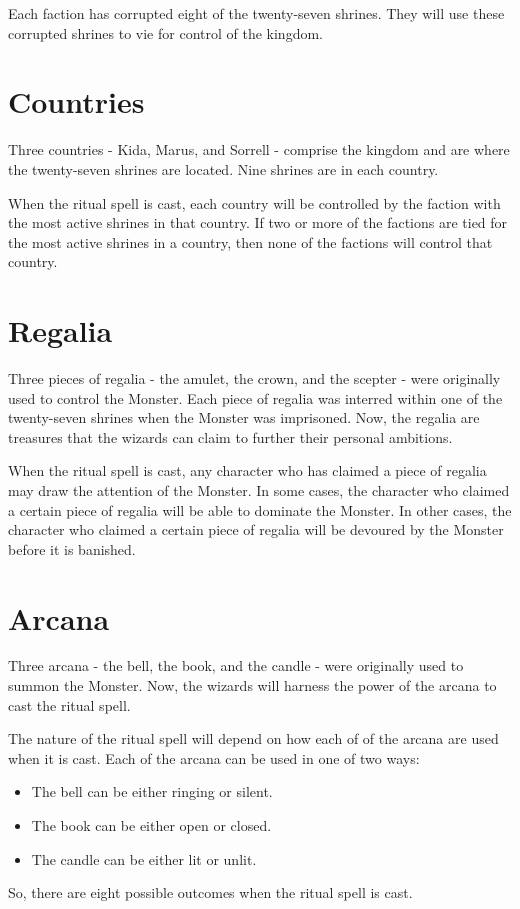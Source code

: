 \documentclass[10pt, parskip=half-, twoside]{scrartcl}
\begin{document}
Each faction has corrupted eight of the twenty-seven shrines. They will use these corrupted shrines to vie for control of the kingdom.

\section*{Countries}
Three countries - Kida, Marus, and Sorrell - comprise the kingdom and are where the twenty-seven shrines are located. Nine shrines are in each country.

When the ritual spell is cast, each country will be controlled by the faction with the most active shrines in that country. If two or more of the factions are tied for the most active shrines in a country, then none of the factions will control that country.

\newpage

\section*{Regalia}
Three pieces of regalia - the amulet, the crown, and the scepter - were originally used to control the Monster. Each piece of regalia was interred within one of the twenty-seven shrines when the Monster was imprisoned. Now, the regalia are treasures that the wizards can claim to further their personal ambitions.

When the ritual spell is cast, any character who has claimed a piece of regalia may draw the attention of the Monster. In some cases, the character who claimed a certain piece of regalia will be able to dominate the Monster. In other cases, the character who claimed a certain piece of regalia will be devoured by the Monster before it is banished.

\newpage

\section*{Arcana}
Three arcana - the bell, the book, and the candle - were originally used to summon the Monster. Now, the wizards will harness the power of the arcana to cast the ritual spell.

The nature of the ritual spell will depend on how each of of the arcana are used when it is cast. Each of the arcana can be used in one of two ways:
\begin{itemize}
\item The bell can be either ringing or silent.
\item The book can be either open or closed.
\item The candle can be either lit or unlit.
\end{itemize}
So, there are eight possible outcomes when the ritual spell is cast.
\end{document}
